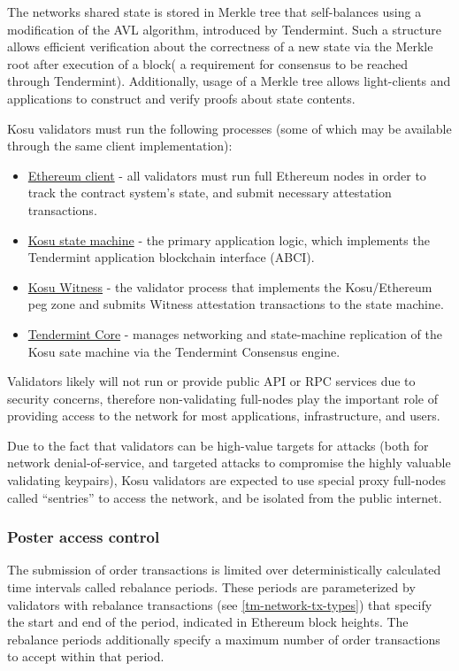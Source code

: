 \documentclass[10pt]{article}
\begin{document}
The networks shared state is stored in Merkle tree that self-balances using a modification of the AVL algorithm, introduced by Tendermint\cite{tendermint-iavl}. Such a structure allows efficient verification about the correctness of a new state via the Merkle root after execution of a block( a requirement for consensus to be reached through Tendermint). Additionally, usage of a Merkle tree allows light-clients and applications to construct and verify proofs about state contents.
\medskip

Kosu validators must run the following processes (some of which may be available through the same client implementation):

\begin{itemize}
  \item \underline{Ethereum client} - all validators must run full Ethereum nodes in order to track the contract system’s state, and submit necessary attestation transactions.
  \item \underline{Kosu state machine} - the primary application logic, which implements the Tendermint application blockchain interface (ABCI)\cite{tendermint-abci-spec}.
  \item \underline{Kosu Witness} - the validator process that implements the Kosu/Ethereum peg zone and submits Witness attestation transactions to the state machine.
  \item \underline{Tendermint Core} - manages networking and state-machine replication of the Kosu sate machine via the Tendermint Consensus engine.
\end{itemize}

Validators likely will not run or provide public API or RPC services due to security concerns, therefore non-validating full-nodes play the important role of providing access to the network for most applications, infrastructure, and users.
\medskip

Due to the fact that validators can be high-value targets for attacks (both for network denial-of-service, and targeted attacks to compromise the highly valuable validating keypairs), Kosu validators are expected to use special proxy full-nodes called “sentries”\cite{sentry-architecture} to access the network, and be isolated from the public internet.
\subsubsection{Poster access control}\label{tm-network-access}
The submission of order transactions is limited over deterministically calculated time intervals called rebalance periods. These periods are parameterized by validators with rebalance transactions (see \ref{tm-network-tx-types}) that specify the start and end of the period, indicated in Ethereum block heights. The rebalance periods additionally specify a maximum number of order transactions to accept within that period. 
\medskip
\end{document}
